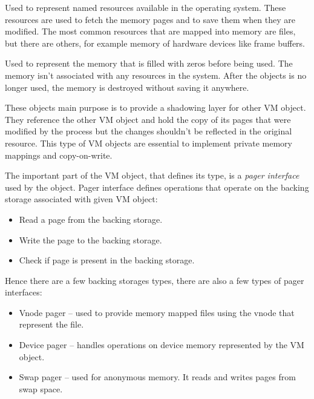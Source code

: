 \begin{description}[style=nextline]
  \item[Named VM objects]
    Used to represent named resources available in the operating system.
    These resources are used to fetch the memory pages and to save them when they are modified.
    The most common resources that are mapped into memory are files, but there are others,
    for example memory of hardware devices like frame buffers.
  \item[Anonymous VM objects]
    Used to represent the memory that is filled with zeros before being used.
    The memory isn't associated with any resources in the system.
    After the objects is no longer used, the memory is destroyed without saving it anywhere.
  \item[Shadow VM objects]
    These objects main purpose is to provide a shadowing layer for other VM object.
    They reference the other VM object and hold the copy of its pages that were modified by the process but the changes shouldn't be
    reflected in the original resource.
    This type of VM objects are essential to implement private memory mappings and copy-on-write.
\end{description}

The important part of the VM object, that defines its type, is a {\it pager interface} used by the object.
Pager interface defines operations that operate on the backing storage associated with given VM object:

\begin{itemize}
  \item Read a page from the backing storage.
  \item Write the page to the backing storage.
  \item Check if page is present in the backing storage.
\end{itemize}

Hence there are a few backing storages types, there are also a few types of pager interfaces:

\begin{itemize}
  \item Vnode pager -- used to provide memory mapped files using the vnode that represent the file.
  \item Device pager -- handles operations on device memory represented by the VM object.
  \item Swap pager -- used for anonymous memory. It reads and writes pages from swap space.
\end{itemize}

